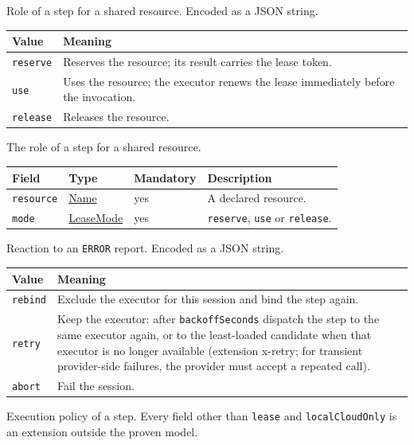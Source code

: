 \documentclass[a4paper]{arrowhead}
\newcommand{\mref}[1]{{\textcolor{ArrowheadPurple}{\hyperref[sec:model:#1]{#1}}}}
\newcommand{\pref}[1]{{\textcolor{ArrowheadGrey}{\hyperref[sec:model:primitives:#1]{#1}}}}
\begin{document}
Role of a step for a shared resource.
 Encoded as a JSON string.
{\small
\begin{longtable}{|p{3.9cm}|p{11.9cm}|}

\hline
\rowcolor{gray!33} Value & Meaning \\ \hline
\endhead
\texttt{reserve} & Reserves the resource; its result carries the lease token. \\ \hline
\texttt{use} & Uses the resource; the executor renews the lease immediately before the invocation. \\ \hline
\texttt{release} & Releases the resource. \\ \hline
\end{longtable}
}

The role of a step for a shared resource.

{\small
\begin{longtable}{|p{3.7cm}|p{4.2cm}|p{1.6cm}|p{6.3cm}|}

\hline
\rowcolor{gray!33} Field & Type & Mandatory & Description \\ \hline
\endhead
\texttt{resource} & \pref{Name} & yes & A declared resource. \\ \hline
\texttt{mode} & \mref{LeaseMode} & yes & \texttt{reserve}, \texttt{use} or \texttt{release}. \\ \hline
\end{longtable}
}

Reaction to an \texttt{ERROR} report.
 Encoded as a JSON string.
{\small
\begin{longtable}{|p{3.9cm}|p{11.9cm}|}

\hline
\rowcolor{gray!33} Value & Meaning \\ \hline
\endhead
\texttt{rebind} & Exclude the executor for this session and bind the step again. \\ \hline
\texttt{retry} & Keep the executor: after \texttt{backoff\allowbreak{}Seconds} dispatch the step to the same executor again, or to the least-loaded candidate when that executor is no longer available (extension x-retry; for transient provider-side failures, the provider must accept a repeated call). \\ \hline
\texttt{abort} & Fail the session. \\ \hline
\end{longtable}
}

Execution policy of a step. Every field other than \texttt{lease} and \texttt{local\allowbreak{}Cloud\allowbreak{}Only} is an extension outside the proven model.
\end{document}
